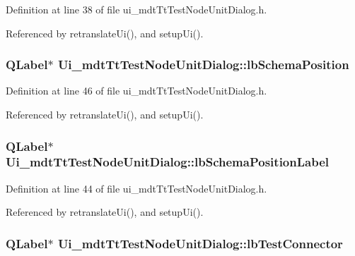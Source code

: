 Definition at line 38 of file ui\-\_\-mdt\-Tt\-Test\-Node\-Unit\-Dialog.\-h.



Referenced by retranslate\-Ui(), and setup\-Ui().

\hypertarget{class_ui__mdt_tt_test_node_unit_dialog_a486398f96ed8fb20932e40b0501045a6}{
\subsubsection[{lb\-Schema\-Position}]{\setlength{\rightskip}{0pt plus 5cm}Q\-Label$\ast$ Ui\-\_\-mdt\-Tt\-Test\-Node\-Unit\-Dialog\-::lb\-Schema\-Position}}\label{class_ui__mdt_tt_test_node_unit_dialog_a486398f96ed8fb20932e40b0501045a6}


Definition at line 46 of file ui\-\_\-mdt\-Tt\-Test\-Node\-Unit\-Dialog.\-h.



Referenced by retranslate\-Ui(), and setup\-Ui().

\hypertarget{class_ui__mdt_tt_test_node_unit_dialog_a806610c6ea6743a8a79ce08296089f51}{
\subsubsection[{lb\-Schema\-Position\-Label}]{\setlength{\rightskip}{0pt plus 5cm}Q\-Label$\ast$ Ui\-\_\-mdt\-Tt\-Test\-Node\-Unit\-Dialog\-::lb\-Schema\-Position\-Label}}\label{class_ui__mdt_tt_test_node_unit_dialog_a806610c6ea6743a8a79ce08296089f51}


Definition at line 44 of file ui\-\_\-mdt\-Tt\-Test\-Node\-Unit\-Dialog.\-h.



Referenced by retranslate\-Ui(), and setup\-Ui().

\hypertarget{class_ui__mdt_tt_test_node_unit_dialog_ac90e12715134bda7ce7edb5fc2266b8a}{
\subsubsection[{lb\-Test\-Connector}]{\setlength{\rightskip}{0pt plus 5cm}Q\-Label$\ast$ Ui\-\_\-mdt\-Tt\-Test\-Node\-Unit\-Dialog\-::lb\-Test\-Connector}}\label{class_ui__mdt_tt_test_node_unit_dialog_ac90e12715134bda7ce7edb5fc2266b8a}


